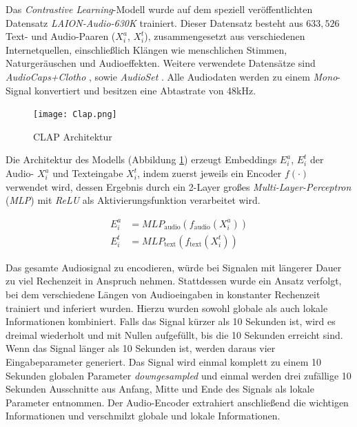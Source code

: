 \documentclass[
  a4paper,  %
  twoside,  %
  bibliography=totoc,
  headsepline,
  cleardoublepage=empty,
  parskip=half,
  draft=false
]{scrbook}
\begin{document}
Das \emph{Contrastive Learning}-Modell wurde auf dem speziell veröffentlichten Datensatz \emph{LAION-Audio-630K} trainiert. Dieser Datensatz besteht aus $633,526$ Text- und Audio-Paaren ($X_i^a$, $X_i^t$), zusammengesetzt aus verschiedenen Internetquellen, einschließlich Klängen wie menschlichen Stimmen, Naturgeräuschen und Audioeffekten. Weitere verwendete Datensätze sind \emph{AudioCaps+Clotho} \cite{kim_audiocaps_2019} \cite{drossos_clotho_2019}, sowie \emph{AudioSet} \cite{gemmeke_audio_2017}. Alle Audiodaten werden zu einem \emph{Mono}-Signal konvertiert und besitzen eine Abtastrate von 48kHz. \cite{wu_large-scale_2023}

\begin{figure}[h]
  \centering
  \texttt{[image: Clap.png]}
  \caption[Clap Architektur]{CLAP Architektur \cite{wu_large-scale_2023}}
  \label{fig:Clap}
\end{figure} 

Die Architektur des Modells (Abbildung \ref{fig:Clap}) erzeugt Embeddings $E_i^a$, $E_i^t$ der Audio- $X_i^a$ und Texteingabe $X_i^t$, indem zuerst jeweils ein Encoder $f(\cdot)$ verwendet wird, dessen Ergebnis durch ein 2-Layer großes \emph{Multi-Layer-Perceptron} (\emph{MLP}) mit \emph{ReLU}\cite{agarap_deep_2019} als Aktivierungsfunktion verarbeitet wird. \cite{wu_large-scale_2023}

\begin{align}
  E_i^a & = M L P_{\text{audio}}\left(f_{\text{audio}}\left(X_i^a\right)\right) \\
  E_i^t & = M L P_{\text{text}}\left(f_{\text{text}}\left(X_i^t\right)\right)
\end{align}

Das gesamte Audiosignal zu encodieren, würde bei Signalen mit längerer Dauer zu viel Rechenzeit in Anspruch nehmen. Stattdessen wurde ein Ansatz verfolgt, bei dem verschiedene Längen von Audioeingaben in konstanter Rechenzeit trainiert und inferiert wurden. Hierzu wurden sowohl globale als auch lokale Informationen kombiniert. Falls das Signal kürzer als 10 Sekunden ist, wird es dreimal wiederholt und mit Nullen aufgefüllt, bis die 10 Sekunden erreicht sind. Wenn das Signal länger als 10 Sekunden ist, werden daraus vier Eingabeparameter generiert. Das Signal wird einmal komplett zu einem 10 Sekunden globalen Parameter \emph{downgesampled} und einmal werden drei zufällige 10 Sekunden Ausschnitte aus Anfang, Mitte und Ende des Signals als lokale Parameter entnommen. Der Audio-Encoder extrahiert anschließend die wichtigen Informationen und verschmilzt globale und lokale Informationen.
\end{document}
